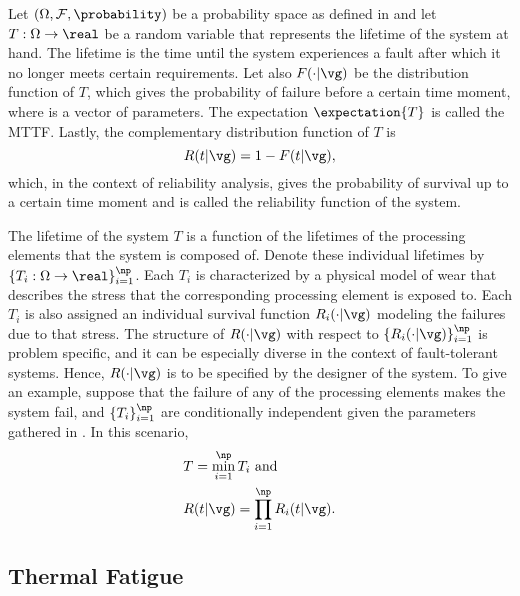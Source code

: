 \newcommand{\mean}{\mu}
\newcommand{\scale}{\eta}
\newcommand{\shape}{\beta}

Let $(\Omega, \mathcal{F}, \probability)$ be a probability space as defined in
 and let $T: \Omega \to \real$ be a random variable
that represents the lifetime of the system at hand. The lifetime is the time
until the system experiences a fault after which it no longer meets certain
requirements. Let also $F(\cdot | \vg)$ be the distribution function of $T$,
which gives the probability of failure before a certain time moment, where \vg
is a vector of parameters. The expectation $\expectation{T}$ is called the
\ac{MTTF}. Lastly, the complementary distribution function of $T$ is
\[
  R(t | \vg) = 1 - F(t | \vg),
\]
which, in the context of reliability analysis, gives the probability of survival
up to a certain time moment and is called the reliability function of the
system.

The lifetime of the system $T$ is a function of the lifetimes of the \np
processing elements that the system is composed of. Denote these individual
lifetimes by $\{ T_i: \Omega \to \real \}_{i = 1}^\np$. Each $T_i$ is
characterized by a physical model of wear \cite{jedec2016} that describes the
stress that the corresponding processing element is exposed to. Each $T_i$ is
also assigned an individual survival function $R_i(\cdot | \vg)$ modeling the
failures due to that stress. The structure of $R(\cdot | \vg)$ with respect to
$\{ R_i(\cdot | \vg) \}_{i = 1}^\np$ is problem specific, and it can be
especially diverse in the context of fault-tolerant systems. Hence, $R(\cdot |
\vg)$ is to be specified by the designer of the system. To give an example,
suppose that the failure of any of the \np processing elements makes the system
fail, and $\{ T_i \}_{i = 1}^\np$ are conditionally independent given the
parameters gathered in \vg. In this scenario,
\begin{align*}
  & T = \min_{i = 1}^\np T_i \text{ and} \\
  & R(t | \vg) = \prod_{i = 1}^\np R_i(t | \vg).
\end{align*}

\subsection{Thermal Fatigue}

